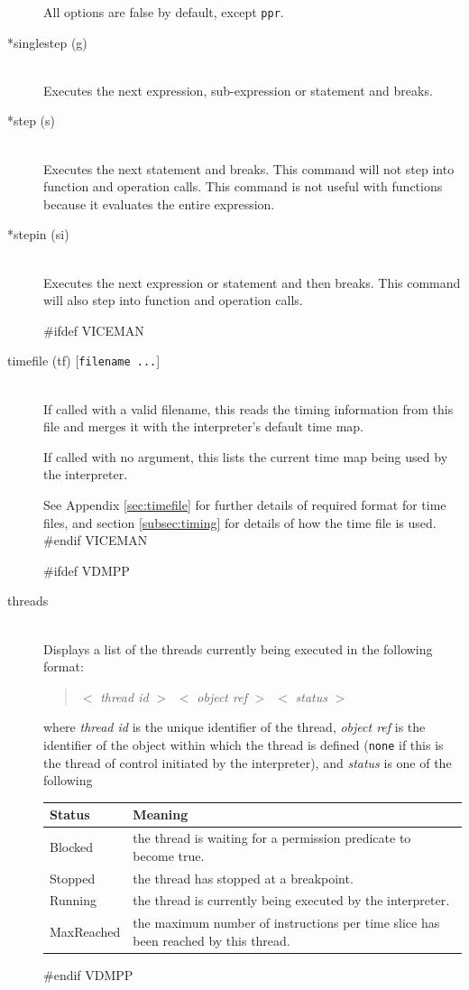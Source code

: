 \documentclass[\pformat,12pt]{article}
\begin{document}
\begin{description}
  All options are false by default, except {\tt ppr}.
 
\item[*singlestep (g)] \mbox{}\\
  Executes the next expression, sub-expression or statement
  and breaks.

\item[*step (s)] \mbox{}\\
  Executes the next statement and breaks. This command will not step
  into function and operation calls. This command is not useful with
  functions because it evaluates the entire expression.

\item[*stepin (si)] \mbox{}\\
  Executes the next expression or statement and then breaks. This
  command will also step into function and operation calls.

#ifdef VICEMAN
\item[timefile (tf) \mbox{[{\tt filename ...}]}] \mbox{}\\
  If called with a valid filename, this reads the timing information
  from this file and merges it with the interpreter's default time
  map.

  If called with no argument, this lists the current time map being
  used by the interpreter.

  See Appendix \ref{sec:timefile} for further details of required
  format for time files, and section \ref{subsec:timing} for details
  of how the time file is used.
#endif VICEMAN

#ifdef VDMPP
\item[threads]\mbox{}\\
  Displays a list of the threads currently being executed in the
following format:
\begin{quote}
  $<$ \textit{thread id} $>$\ $<$ \textit{object ref} $>$\ $<$
\textit{status} $>$
\end{quote}
where \textit{thread id} is the unique identifier of the thread,
\textit{object ref} is the identifier of the object within which the
thread is defined (\texttt{none} if this is the thread of control
initiated by the interpreter), and \textit{status} is one of the following

\begin{tabular}{lp{10cm}}\hline
Status & Meaning \\ \hline
Blocked    & the thread is waiting for a permission predicate to
             become true. \\ 
Stopped    & the thread has stopped at a breakpoint.\\
Running    & the thread is currently being executed by the interpreter. \\
MaxReached & the maximum number of instructions per time slice has
              been reached by this thread. \\ \hline 
\end{tabular}
#endif VDMPP


\end{description}
\end{document}
